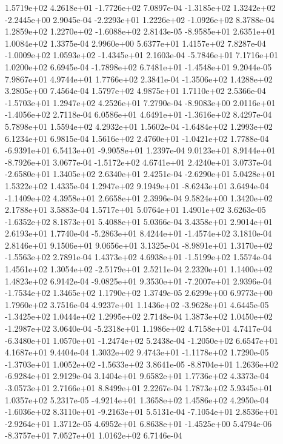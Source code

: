  1.5719e+02  4.2618e+01 -1.7726e+02  7.0897e-04
-1.3185e+02  1.3242e+02 -2.2445e+00  2.9045e-04
-2.2293e+01  1.2226e+02 -1.0926e+02  8.3788e-04
 1.2859e+02  1.2270e+02 -1.6088e+02  2.8143e-05
-8.9585e+01  2.6351e+01  1.0084e+02  1.3375e-04
2.9960e+00 5.6377e+01 1.4157e+02  7.8287e-04
-1.0009e+02  1.0593e+02 -1.4345e+01  2.1603e-04
-5.7846e+01  7.1716e+01  1.0200e+02  6.6945e-04
-1.7898e+02  6.7481e+01 -1.4548e+01  9.2044e-05
7.9867e+01 4.9744e+01 1.7766e+02  2.3841e-04
-1.3506e+02  1.4288e+02  3.2805e+00  7.4564e-04
1.5797e+02 4.9875e+01 1.7110e+02  2.5366e-04
-1.5703e+01  1.2947e+02  4.2526e+01  7.2790e-04
-8.9083e+00  2.0116e+01 -1.4056e+02  2.7118e-04
 6.0586e+01  4.6491e+01 -1.3616e+02  8.4297e-04
5.7898e+01 1.5594e+02 4.2932e+01  1.5602e-04
-1.6484e+02  1.2993e+02  6.1234e+01  6.9815e-04
 1.5616e+02  2.4760e+01 -1.0421e+02  1.7788e-04
-6.9391e+01  6.5413e+01 -9.9058e+01  1.2397e-04
 9.0123e+01  8.9144e+01 -8.7926e+01  3.0677e-04
-1.5172e+02  4.6741e+01  2.4240e+01  3.0737e-04
-2.6580e+01  1.3405e+02  2.6340e+01  2.4251e-04
-2.6290e+01  5.0428e+01  1.5322e+02  1.4335e-04
 1.2947e+02  9.1949e+01 -8.6243e+01  3.6494e-04
-1.1409e+02  4.3958e+01  2.6658e+01  2.3996e-04
9.5824e+00 1.3420e+02 2.1788e+01  3.5883e-04
1.5717e+01 5.0764e+01 1.4901e+02  3.6263e-05
-1.6352e+02  8.1873e+01  5.4088e+01  5.0366e-04
3.4358e+01 2.9014e+01 2.6193e+01  1.7740e-04
-5.2863e+01  8.4244e+01 -1.4574e+02  3.1810e-04
2.8146e+01 9.1506e+01 9.0656e+01  3.1325e-04
-8.9891e+01  1.3170e+02 -1.5563e+02  2.7891e-04
 1.4373e+02  4.6938e+01 -1.5199e+02  1.5574e-04
 1.4561e+02  1.3054e+02 -2.5179e+01  2.5211e-04
2.2320e+01 1.1400e+02 1.4823e+02  6.9142e-04
-9.0825e+01  9.3530e+01 -7.2007e+01  2.9396e-04
-1.7534e+02  1.3465e+02  1.1790e+02  1.3749e-05
2.6299e+00 6.9773e+00 1.7960e+02  3.7516e-04
 4.9237e+01  1.1436e+02 -3.9628e+01  4.6445e-05
-1.3425e+02  1.0444e+02  1.2995e+02  2.7148e-04
 1.3873e+02  1.0450e+02 -1.2987e+02  3.0640e-04
-5.2318e+01  1.1986e+02  4.7158e+01  4.7417e-04
-6.3480e+01  1.0570e+01 -1.2474e+02  5.2438e-04
-1.2050e+02  6.6547e+01  4.1687e+01  9.4404e-04
 1.3032e+02  9.4743e+01 -1.1178e+02  1.7290e-05
-1.3703e+01  1.0052e+02 -1.5633e+02  3.8641e-05
-8.8704e+01  1.2636e+02 -6.9284e+01  2.9129e-04
3.1404e+01 9.6582e+01 1.7736e+02  4.3373e-04
-3.0573e+01  2.7166e+01  8.8499e+01  2.2267e-04
1.7873e+02 5.9345e+01 1.0357e+02  5.2317e-05
-4.9214e+01  1.3658e+02  1.4586e+02  4.2950e-04
-1.6036e+02  8.3110e+01 -9.2163e+01  5.5131e-04
-7.1054e+01  2.8536e+01 -2.9264e+01  1.3712e-05
 4.6952e+01  6.8638e+01 -1.4525e+00  5.4794e-06
-8.3757e+01  7.0527e+01  1.0162e+02  6.7146e-04
